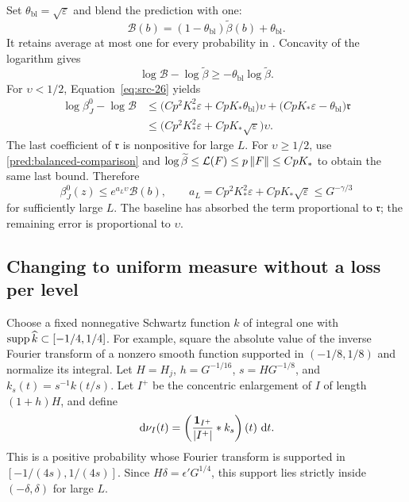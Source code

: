 Set \(\theta_{\mathrm{bl}}=\sqrt\varepsilon\) and blend the prediction with one:
\begin{equation}
 \mathcal B(b)=(1-\theta_{\mathrm{bl}})\widetilde\beta(b)+\theta_{\mathrm{bl}}.
 \label{pred:blend}
\end{equation}
It retains average at most one for every probability in
. Concavity of the logarithm gives
\[
 \log \mathcal B-\log\widetilde\beta
       \ge-\theta_{\mathrm{bl}}\log\widetilde\beta.
\]
For \(\upsilon<1/2\), Equation~\eqref{eq:src-26} yields
\begin{align*}
 \log\beta_J^0-\log \mathcal B
 &\le\bigl(Cp^2K_*^2\varepsilon+CpK_*\theta_{\mathrm{bl}}\bigr)\upsilon
       +\bigl(CpK_*\varepsilon-\theta_{\mathrm{bl}}\bigr)\mathfrak r\\
 &\le\bigl(Cp^2K_*^2\varepsilon
                  +CpK_*\sqrt\varepsilon\bigr)\upsilon.
\end{align*}
The last coefficient of \(\mathfrak r\) is nonpositive for large \(L\).
For \(\upsilon\ge1/2\), use \eqref{pred:balanced-comparison} and
\(\log\widetilde\beta\le\mathcal L(F)\le p\left\|F\right\|\le CpK_*\)
to obtain the same last bound. Therefore
\begin{equation}
 \beta_J^0(z)\le e^{a_L\upsilon}\mathcal B(b),\qquad
 a_L=Cp^2K_*^2\varepsilon+CpK_*\sqrt\varepsilon
       \le G^{-\gamma/3}
 \label{pred:blended-domination}
\end{equation}
for sufficiently large \(L\).
The baseline has absorbed the term proportional to \(\mathfrak r\);
the remaining error is proportional to \(\upsilon\).

\subsection{Changing to uniform measure without a loss per level}

Choose a fixed nonnegative Schwartz function \(k\) of integral one
with \(\operatorname{supp}\widehat k\subset[-1/4,1/4]\).
For example, square the absolute value of the inverse Fourier
transform of a nonzero smooth function supported in \((-1/8,1/8)\)
and normalize its integral.
Let \(H=H_j\), \(h=G^{-1/16}\), \(s=HG^{-1/8}\), and
\(k_s(t)=s^{-1}k(t/s)\).
Let \(I^+\) be the concentric enlargement of \(I\) of length
\((1+h)H\), and define
\begin{equation}
 \,\mathrm d\nu_I(t)=
      \left(\frac{\mathbf 1_{I^+}}{|I^+|}*k_s\right)(t)\,\,\mathrm d t.
 \label{pred:majorant-probability}
\end{equation}
This is a positive probability whose Fourier transform is supported
in \([-1/(4s),1/(4s)]\).
Since \(H\delta=\epsilon'G^{1/4}\), this support lies strictly inside
\((-\delta,\delta)\) for large \(L\).

